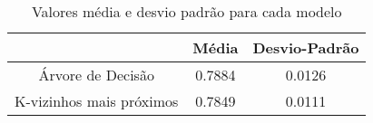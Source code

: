\begin{table}[htbp]
	\caption{Valores média e desvio padrão para cada modelo}
    \begin{center}
    \begin{tabular}{|c|c|c|}
    \hline
    & \textbf{Média} & \textbf{Desvio-Padrão}\\
    \hline
    Árvore de Decisão & 0.7884 & 0.0126\\
    \hline
    K-vizinhos mais próximos & 0.7849 & 0.0111 \\
    \hline
    \end{tabular}
    \label{tab_9_1}
    \end{center}
\end{table}
